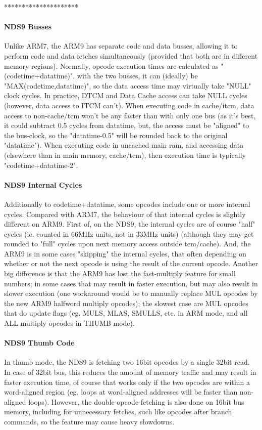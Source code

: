 \documentclass[11pt,a4paper]{proc}
\begin{document}
\begin{flushleft}
*********************

\paragraph{NDS9 Busses}
Unlike ARM7, the ARM9 has separate code and data busses, allowing it to perform code and data fetches simultaneously (provided that both are in different memory regions).
Normally, opcode execution times are calculated as "(codetime+datatime)", with the two busses, it can (ideally) be "MAX(codetime,datatime)", so the data access time may virtually take "NULL" clock cycles.
In practice, DTCM and Data Cache access can take NULL cycles (however, data access to ITCM can't).
When executing code in cache/itcm, data access to non-cache/tcm won't be any faster than with only one bus (as it's best, it could subtract 0.5 cycles from datatime, but, the access must be "aligned" to the bus-clock, so the "datatime-0.5" will be rounded back to the original "datatime").
When executing code in uncached main ram, and accessing data (elsewhere than in main memory, cache/tcm), then execution time is typically "codetime+datatime-2".

\paragraph{NDS9 Internal Cycles}
Additionally to codetime+datatime, some opcodes include one or more internal cycles. Compared with ARM7, the behaviour of that internal cycles is slightly different on ARM9. First of, on the NDS9, the internal cycles are of course "half" cycles (ie. counted in 66MHz units, not in 33MHz units) (although they may get rounded to "full" cycles upon next memory access outside tcm/cache). And, the ARM9 is in some cases "skipping" the internal cycles, that often depending on whether or not the next opcode is using the result of the current opcode.
Another big difference is that the ARM9 has lost the fast-multiply feature for small numbers; in some cases that may result in faster execution, but may also result in slower execution (one workaround would be to manually replace MUL opcodes by the new ARM9 halfword multiply opcodes); the slowest case are MUL opcodes that do update flags (eg. MULS, MLAS, SMULLS, etc. in ARM mode, and all ALL multiply opcodes in THUMB mode).

\paragraph{NDS9 Thumb Code}
In thumb mode, the NDS9 is fetching two 16bit opcodes by a single 32bit read. In case of 32bit bus, this reduces the amount of memory traffic and may result in faster execution time, of course that works only if the two opcodes are within a word-aligned region (eg. loops at word-aligned addresses will be faster than non-aligned loops). However, the double-opcode-fetching is also done on 16bit bus memory, including for unnecessary fetches, such like opcodes after branch commands, so the feature may cause heavy slowdowns.


\end{flushleft}
\end{document}
